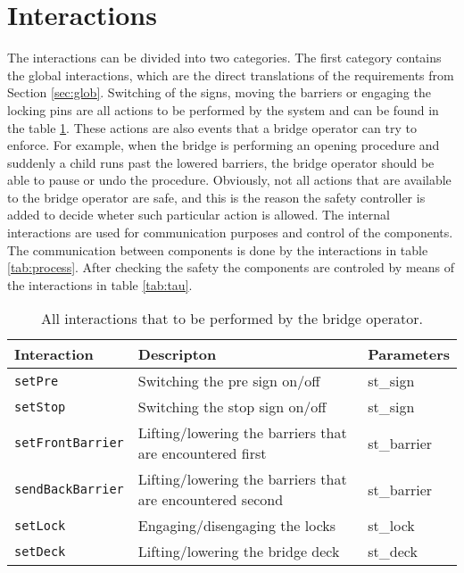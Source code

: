 \section{Interactions}
\label{sec:act}


The interactions can be divided into two categories. The first category contains the global interactions, which are the direct translations of the requirements from Section \ref{sec:glob}.
Switching of the signs, moving the barriers or engaging the locking pins are all actions to be performed by the system and can be found in the table \ref{tab:glob}. These actions are also events that a bridge operator can try to enforce. For example, when the bridge is performing an opening procedure and suddenly a child runs past the lowered barriers, the bridge operator should be able to pause or undo the procedure. Obviously, not all actions that are available to the bridge operator are safe, and this is the reason the safety controller is added to decide wheter such particular action is allowed.
The internal interactions are used for communication purposes and control of the components. The communication between components is done by the interactions in table \ref{tab:process}. After checking the safety the components are controled by means of the interactions in table \ref{tab:tau}.
%
\begin{table}[htb]%
\begin{tabular}{lll}
			\textbf{Interaction} &	\textbf{Descripton}	&	\textbf{Parameters}\\
  		\hline
  		\texttt{setPre} & Switching the pre sign on/off & st\_sign\\
      \texttt{setStop} & Switching the stop sign on/off & st\_sign\\
      \texttt{setFrontBarrier} & Lifting/lowering the barriers that are encountered first & st\_barrier\\
			\texttt{sendBackBarrier} & Lifting/lowering the barriers that are encountered second & st\_barrier\\
      \texttt{setLock} & Engaging/disengaging the locks & st\_lock\\
      \texttt{setDeck} & Lifting/lowering the bridge deck & st\_deck\\
\end{tabular}
\caption{All interactions that to be performed by the bridge operator.}
\label{tab:glob}
\end{table}
%
